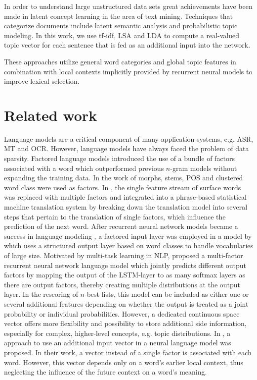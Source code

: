 \documentclass[a4paper]{article}
\begin{document}
In order to understand large unstructured data sets great achievements have been made in latent concept learning in the area of text mining. Techniques that categorize documents include latent semantic analysis and probabilistic topic modeling. In this work, we use tf-idf, LSA and LDA to compute a real-valued topic vector for each sentence that is fed as an additional input into the network. 

These approaches utilize general word categories and global topic features in combination with local contexts implicitly provided by recurrent neural models to improve lexical selection. 


\section{Related work}
Language models are a critical component of many application systems, e.g. ASR, MT and OCR. However, language models have always faced the problem of data sparsity. Factored language models \cite{bilmes2003factored} introduced the use of a bundle of factors associated with a word which outperformed previous $n$-gram models without expanding the training data. In the work of \cite{bilmes2003factored} morphs, stems, POS and clustered word class were used as factors. In \cite{koehn2007factored}, the single feature stream of surface words was replaced with multiple factors and integrated into a phrase-based statistical machine translation system by breaking down the translation model into several steps that pertain to the translation of single factors, which influence the prediction of the next word.
After recurrent neural network models became a success in language modeling \cite{mikolov2010recurrent}, a factored input layer was employed in a model by \cite{wu2012factored} which uses a structured output layer based on word classes to handle vocabularies of large size.
Motivated by multi-task learning in NLP, \cite{niehuesusing} proposed a multi-factor recurrent neural network language model which jointly predicts different output factors by mapping the output of the LSTM-layer \cite{hochreiter1997long} to as many softmax layers as there are output factors, thereby creating multiple distributions at the output layer. In the rescoring of $n$-best lists, this model can be included as either one or several additional features depending on whether the output is treated as a joint probability or individual probabilities.
However, a dedicated continuous space vector offers more flexibility and possibility to store additional side information, especially for complex, higher-level concepts, e.g. topic distributions. In \cite{mikolov2012context}, a approach to use an additional input vector in a neural language model was proposed. In their work, a vector instead of a single factor is associated with each word. However, this vector depends only on a word's earlier local context, thus neglecting the influence of the future context on a word's meaning. 
\end{document}
